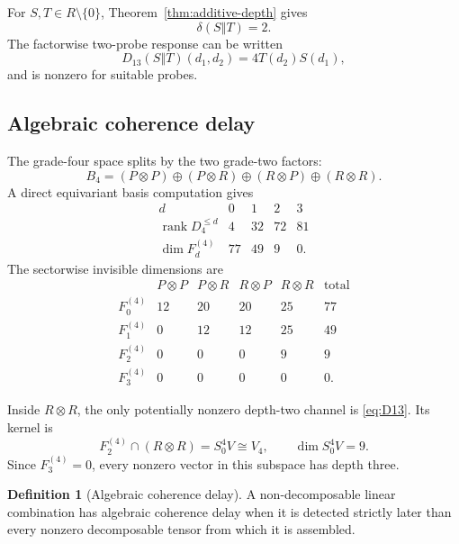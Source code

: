 \documentclass[11pt]{article}
\theoremstyle{definition}
\newtheorem{definition}[theorem]{Definition}
\theoremstyle{remark}
\newcommand{\depth}{\delta}
\newcommand{\concat}{\mathbin{\Vert}}
\begin{document}
For $S,T\in R\setminus\{0\}$, Theorem~\ref{thm:additive-depth} gives
\begin{equation}\label{eq:pure-residual-depth}
  \depth(S\concat T)=2.
\end{equation}
The factorwise two-probe response can be written
\begin{equation}\label{eq:D13}
  D_{13}(S\concat T)(d_1,d_2)=4T(d_2)S(d_1),
\end{equation}
and is nonzero for suitable probes.

\subsection{Algebraic coherence delay}

The grade-four space splits by the two grade-two factors:
\begin{equation}\label{eq:b4-sector}
  B_4=(P\otimes P)\oplus(P\otimes R)\oplus(R\otimes P)\oplus(R\otimes R).
\end{equation}
A direct equivariant basis computation gives
\begin{equation}\label{eq:b4-ranks}
\begin{array}{c|cccc}
 d&0&1&2&3\\
 \hline
 \operatorname{rank}D_4^{\le d}&4&32&72&81\\
 \dim F_d^{(4)}&77&49&9&0.
\end{array}
\end{equation}
The sectorwise invisible dimensions are
\begin{equation}\label{eq:b4-sector-table}
\begin{array}{c|rrrr|r}
 &P\otimes P&P\otimes R&R\otimes P&R\otimes R&\text{total}\\
\hline
F_0^{(4)}&12&20&20&25&77\\
F_1^{(4)}&0&12&12&25&49\\
F_2^{(4)}&0&0&0&9&9\\
F_3^{(4)}&0&0&0&0&0.
\end{array}
\end{equation}

Inside $R\otimes R$, the only potentially nonzero depth-two channel is \eqref{eq:D13}.  Its kernel is
\begin{equation}\label{eq:spin-four-survivor}
  F_2^{(4)}\cap(R\otimes R)=S^4_0V\cong V_4,
  \qquad \dim S^4_0V=9.
\end{equation}
Since $F_3^{(4)}=0$, every nonzero vector in this subspace has depth three.

\begin{definition}[Algebraic coherence delay]
A non-decomposable linear combination has algebraic coherence delay when it is detected strictly later than every nonzero decomposable tensor from which it is assembled.
\end{definition}
\end{document}
